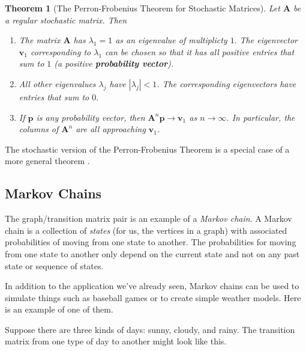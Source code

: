 \documentclass[
]{book}
\newtheorem{theorem}{Theorem}[chapter]
\theoremstyle{definition}
\theoremstyle{definition}
\theoremstyle{definition}
\theoremstyle{definition}
\theoremstyle{remark}
\begin{document}
\begin{theorembox}

\begin{theorem}[The Perron-Frobenius Theorem for Stochastic Matrices]

Let \(\mathbf{A}\) be a regular stochastic matrix. Then

\begin{enumerate}
\def\labelenumi{\arabic{enumi}.}
\item
  The matrix \(\mathbf{A}\) has \(\lambda_1=1\) as an eigenvalue of multiplicty \(1.\) The eigenvector \(\mathbf{v}_1\) corresponding to \(\lambda_1\) can be chosen so that it has all positive entries that sum to \(1\) (a positive \textbf{probability vector}).
\item
  All other eigenvalues \(\lambda_j\) have \(|\lambda_j|<1\). The corresponding eigenvectors have entries that sum to \(0.\)
\item
  If \(\mathbf{p}\) is any probability vector, then \(\mathbf{A}^n\mathbf{p}\to\mathbf{v}_1\) as \(n\to\infty\). In particular, the columns of \(\mathbf{A}^n\) are all approaching \(\mathbf{v}_1\).
\end{enumerate}

\end{theorem}

\end{theorembox}

The stochastic version of the Perron-Frobenius Theorem is a special case of a more general theorem \autocite{Meyer}.

\subsection*{Markov Chains}\label{markov-chains}

The graph/transition matrix pair is an example of a \emph{Markov chain}. A Markov chain is a collection of \emph{states} (for us, the vertices in a graph) with associated probabilities of moving from one state to another. The probabilities for moving from one state to another only depend on the current state and not on any past state or sequence of states.

In addition to the application we've already seen, Markov chains can be used to simulate things such as baseball games or to create simple weather models. Here is an example of one of them.

Suppose there are three kinds of days: sunny, cloudy, and rainy. The transition matrix from one type of day to another might look like this.
\end{document}
